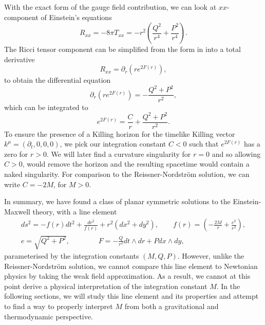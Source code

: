 With the exact form of the gauge field contribution, we can look at $xx$-component of Einstein's equations
\begin{equation*}
	R_{xx} = -8\pi T_{xx} = -r^2 \left( \frac{Q^2}{r^4} + \frac{P^2}{r^4} \right).
\end{equation*}
The Ricci tensor component can be simplified from the form in  into a total derivative
\begin{equation*}
	R_{xx} =  \partial_r \left( r e^{2F(r)} \right),
\end{equation*}
to obtain the differential equation
\begin{equation*}
	 \partial_r \left( r e^{2F(r)} \right) = - \frac{Q^2 + P^2}{r^2},
\end{equation*}
which can be integrated to 
\begin{equation}
\label{eq:planarsolutionf}
	e^{2F(r)} = \frac{C}{r} + \frac{Q^2 + P^2}{r^2}.
\end{equation}
To ensure the presence of a Killing horizon for the timelike Killing vector $k^\mu = (\partial_t,0,0,0)$, we pick our integration constant $C < 0$ such that $e^{2F(r)}$ has a zero for $r > 0$. We will later find a curvature singularity for $r = 0$ and so allowing $C > 0$, would remove the horizon and the resulting spacetime would contain a naked singularity. For comparison to the Reissner-Nordstr\"om solution, we can write $C = -2M$, for $M > 0$.

In summary, we have found a class of planar symmetric solutions to the Einstein-Maxwell theory, with a line element
\begin{equation}
\label{eq:planareinsteinmaxwell}
\begin{gathered}
	ds^2 = -f(r) dt^2 + \frac{dr^2}{f(r)} + r^2 (dx^2 + dy^2), \qquad f(r) = \left( -\frac{2M}{r} + \frac{e^2}{r^2} \right), \\
	e = \sqrt{Q^2 + P^2}, \qquad \qquad F = -\frac{Q}{r^2} dt \wedge dr + P dx \wedge dy,
\end{gathered}
\end{equation}
parameterised by the integration constants $(M, Q, P)$. However, unlike the Reissner-Nordstr\"om solution, we cannot compare this line element to Newtonian physics by taking the weak field approximation. As a result, we cannot at this point derive a physical interpretation of the integration constant $M$. In the following sections, we will study this line element and its properties and attempt to find a way to properly interpret $M$ from both a gravitational and thermodynamic perspective.

